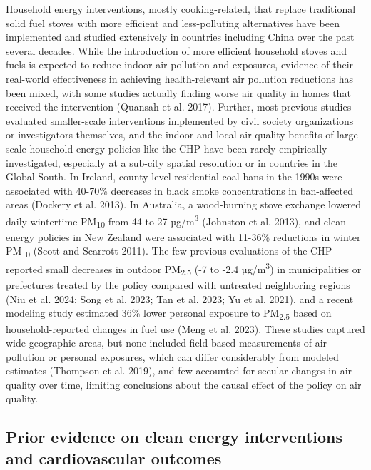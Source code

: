\documentclass[
  letterpaper,
  DIV=11,
  numbers=noendperiod]{scrartcl}
\begin{document}
Household energy interventions, mostly cooking-related, that replace
traditional solid fuel stoves with more efficient and less-polluting
alternatives have been implemented and studied extensively in countries
including China over the past several decades. While the introduction of
more efficient household stoves and fuels is expected to reduce indoor
air pollution and exposures, evidence of their real-world effectiveness
in achieving health-relevant air pollution reductions has been mixed,
with some studies actually finding worse air quality in homes that
received the intervention (Quansah et al. 2017). Further, most previous
studies evaluated smaller-scale interventions implemented by civil
society organizations or investigators themselves, and the indoor and
local air quality benefits of large-scale household energy policies like
the CHP have been rarely empirically investigated, especially at a
sub-city spatial resolution or in countries in the Global South. In
Ireland, county-level residential coal bans in the 1990s were associated
with 40-70\% decreases in black smoke concentrations in ban-affected
areas (Dockery et al. 2013). In Australia, a wood-burning stove exchange
lowered daily wintertime PM\textsubscript{10} from 44 to 27
µg/m\textsuperscript{3} (Johnston et al. 2013), and clean energy
policies in New Zealand were associated with 11-36\% reductions in
winter PM\textsubscript{10} (Scott and Scarrott 2011). The few previous
evaluations of the CHP reported small decreases in outdoor
PM\textsubscript{2.5} (-7 to -2.4 µg/m\textsuperscript{3}) in
municipalities or prefectures treated by the policy compared with
untreated neighboring regions (Niu et al. 2024; Song et al. 2023; Tan et
al. 2023; Yu et al. 2021), and a recent modeling study estimated 36\%
lower personal exposure to PM\textsubscript{2.5} based on
household-reported changes in fuel use (Meng et al. 2023). These studies
captured wide geographic areas, but none included field-based
measurements of air pollution or personal exposures, which can differ
considerably from modeled estimates (Thompson et al. 2019), and few
accounted for secular changes in air quality over time, limiting
conclusions about the causal effect of the policy on air quality.

\subsection{Prior evidence on clean energy interventions and
cardiovascular
outcomes}\label{prior-evidence-on-clean-energy-interventions-and-cardiovascular-outcomes}
\end{document}
